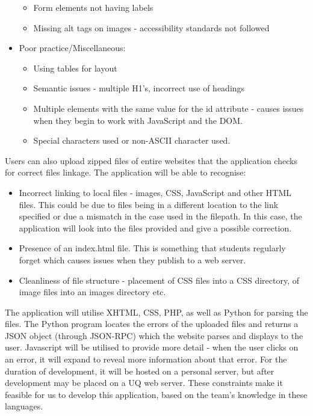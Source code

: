 \documentclass[12pt]{article}
\begin{document}
\begin{itemize}
\begin{itemize}
\item Form elements not having labels
\item Missing alt tags on images - accessibility standards not followed
\end{itemize}
\item Poor practice/Miscellaneous:
\begin{itemize}
\item Using tables for layout
\item Semantic issues - multiple H1's, incorrect use of headings
\item Multiple elements with the same value for the id attribute - causes issues when they begin to work with JavaScript and the DOM.
\item Special characters used or non-ASCII character used.
\end{itemize}\end{itemize}

Users can also upload zipped files of entire websites that the application checks for correct files linkage. The application will be able to recognise: 
\begin{itemize}
\item Incorrect linking to local files - images, CSS, JavaScript and other HTML files. This could be due to files being in a different location to the link specified or due a mismatch in the case used in the filepath. In this case, the application will look into the files provided and give a possible correction.
\item  Presence of an index.html file. This is something that students regularly forget which causes issues when they publish to a web server.
\item  Cleanliness of file structure - placement of CSS files into a CSS directory, of image files into an images directory etc.
\end{itemize}

The application will utilise XHTML, CSS, PHP, as well as Python for parsing the files. The Python program locates the errors of the uploaded files and returns a JSON object (through JSON-RPC) which the website parses and displays to the user. Javascript will be utilised to provide more detail - when the user clicks on an error, it will expand to reveal more information about that error. For the duration of development, it will be hosted on a personal server, but after development may be placed on a UQ web server. These constraints make it feasible for us to develop this application, based on the team's knowledge in these languages.
\end{document}
